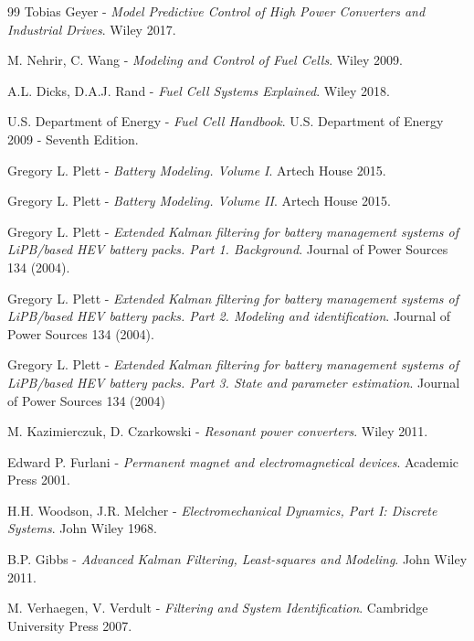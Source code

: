 \documentclass[11pt,a4paper,oneside]{book}
\begin{document}
\begin{onehalfspace}
\begin{thebibliography}{99}
	 Tobias Geyer - \textit{Model Predictive Control of  High Power Converters and Industrial Drives}. Wiley 2017.
		
	 M. Nehrir, C. Wang - \textit{Modeling and Control of Fuel Cells}. Wiley 2009.	

	 A.L. Dicks, D.A.J. Rand - \textit{Fuel Cell Systems Explained}. Wiley 2018.	
	
	 U.S. Department of Energy - \textit{Fuel Cell Handbook}. U.S. Department of Energy 2009 - Seventh Edition.	
	
	 Gregory L. Plett - \textit{Battery Modeling. Volume I}. Artech House 2015.
	
	 Gregory L. Plett - \textit{Battery Modeling. Volume II}. Artech House 2015.
	
	 Gregory L. Plett - \textit{Extended Kalman filtering for battery management systems of LiPB/based HEV battery packs. Part 1. Background}. Journal of Power Sources 134 (2004).
	
	 Gregory L. Plett - \textit{Extended Kalman filtering for battery management systems of LiPB/based HEV battery packs. Part 2. Modeling and identification}. Journal of Power Sources 134 (2004).	
	
	 Gregory L. Plett - \textit{Extended Kalman filtering for battery management systems of LiPB/based HEV battery packs. Part 3. State and parameter estimation}. Journal of Power Sources 134 (2004)
	
	 M. Kazimierczuk, D. Czarkowski - \textit{Resonant power converters}. Wiley 2011.
	
	 Edward P. Furlani - \textit{Permanent magnet and electromagnetical devices}. Academic Press 2001.
	
	 H.H. Woodson, J.R. Melcher - \textit{Electromechanical Dynamics, Part I: Discrete Systems}. John Wiley 1968.

	 B.P. Gibbs - \textit{Advanced Kalman Filtering, Least-squares and Modeling}. John Wiley 2011.	
	
	 M. Verhaegen, V. Verdult - \textit{Filtering and System Identification}. Cambridge University Press 2007.


\end{thebibliography}
\end{onehalfspace}
\end{document}
